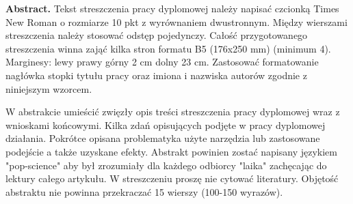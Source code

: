\textbf{Abstract.}
Tekst streszczenia pracy dyplomowej należy napisać czcionką Times New Roman o rozmiarze 10 pkt z wyrównaniem dwustronnym. Między wierszami streszczenia należy stosować odstęp pojedynczy. Całość przygotowanego streszczenia winna zająć kilka stron formatu B5 (176x250 mm) (minimum 4). Marginesy: lewy prawy górny 2 cm dolny 23 cm. Zastosować formatowanie nagłówka stopki tytułu pracy oraz imiona i nazwiska autorów zgodnie z niniejszym wzorcem.

W abstrakcie umieścić zwięzły opis treści streszczenia pracy dyplomowej wraz z wnioskami końcowymi. Kilka zdań opisujących podjęte w pracy dyplomowej działania. Pokrótce opisana problematyka użyte narzędzia lub zastosowane podejście a także uzyskane efekty. Abstrakt powinien zostać napisany językiem "pop-science" aby był zrozumiały dla każdego odbiorcy "laika" zachęcając do lektury całego artykułu. W streszczeniu proszę nie cytować literatury. Objętość abstraktu nie powinna przekraczać 15 wierszy (100-150 wyrazów).
